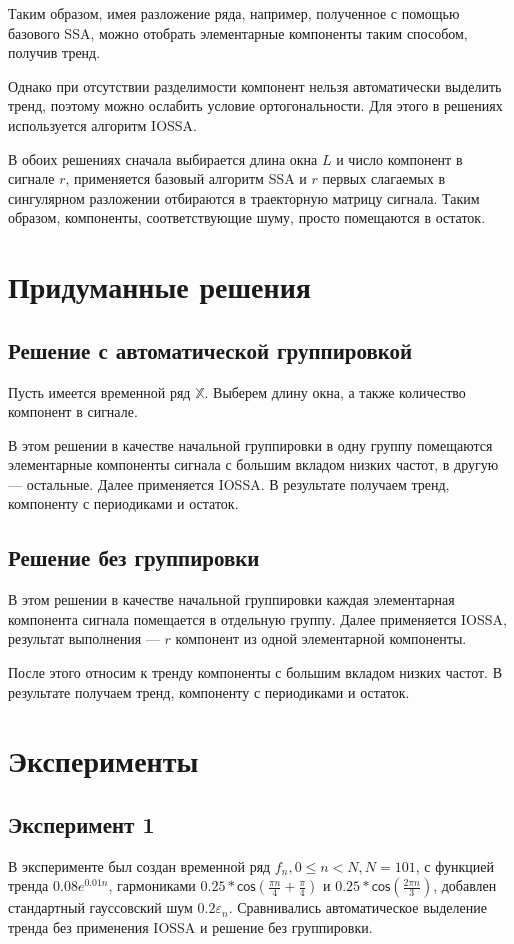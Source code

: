 \documentclass[specialist,
               substylefile = spbu_report.rtx,
               subf,href,colorlinks=true, 12pt]{disser}
\theoremstyle{definition}
\begin{document}
Таким образом, имея разложение ряда, например, полученное с помощью базового SSA, можно отобрать элементарные компоненты таким способом, получив тренд.

Однако при отсутствии разделимости компонент нельзя автоматически выделить тренд, поэтому можно ослабить условие ортогональности. Для этого в решениях используется алгоритм IOSSA.

В обоих решениях сначала выбирается длина окна $L$ и число компонент в сигнале $r$, применяется базовый алгоритм SSA и $r$ первых слагаемых в сингулярном разложении отбираются в траекторную матрицу сигнала. Таким образом, компоненты, соответствующие шуму, просто помещаются в остаток.
\section{Придуманные решения}
\subsection{Решение с автоматической группировкой}
Пусть имеется временной ряд $\mathbb{X}$. Выберем длину окна, а также количество компонент в сигнале.

В этом решении в качестве начальной группировки в одну группу помещаются элементарные компоненты сигнала с большим вкладом низких частот, в другую — остальные. Далее применяется IOSSA. В результате получаем тренд, компоненту с периодиками и остаток.

\subsection{Решение без группировки}
В этом решении в качестве начальной группировки каждая элементарная компонента сигнала помещается в отдельную группу. Далее применяется IOSSA, результат выполнения --- $r$ компонент из одной элементарной компоненты.

После этого относим к тренду компоненты с большим вкладом низких
частот. В результате получаем тренд, компоненту с периодиками и остаток.

\section{Эксперименты}
\subsection{Эксперимент 1}
В эксперименте был создан временной ряд $f_n , 0\leq n < N, N=101$, с функцией тренда $0.08e^{0.01n}$, гармониками $0.25 * \mathsf{cos}(\frac{\pi n}{4} + \frac{\pi}{4})$ и $0.25 * \mathsf{cos}(\frac{2 \pi n}{3})$, добавлен стандартный гауссовский шум $0.2 \varepsilon_n$.
Сравнивались автоматическое выделение тренда без применения IOSSA и решение без группировки.
\end{document}
